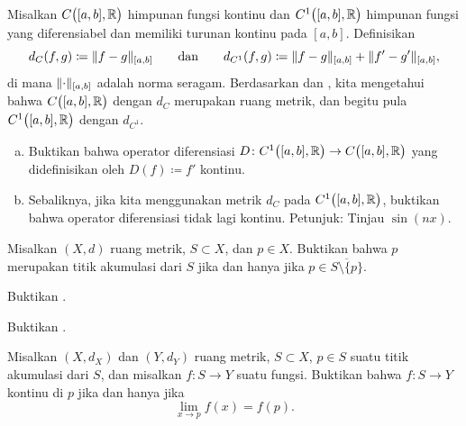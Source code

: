 \begin{samepage}
\begin{exercise}
Misalkan $C\bigl([a,b],{\mathbb{R}}\bigr)$ himpunan fungsi kontinu dan
$C^1\bigl([a,b],{\mathbb{R}}\bigr)$ himpunan fungsi yang
diferensiabel dan memiliki turunan kontinu pada $[a,b]$.
Definisikan
\begin{equation*}
d_{C}(f,g) \coloneqq \lVert {f-g} \rVert_{[a,b]}
\qquad \text{dan} \qquad
d_{C^1}(f,g) \coloneqq \lVert {f-g} \rVert_{[a,b]} + \lVert {f'-g'} \rVert_{[a,b]},
\end{equation*}
di mana $\lVert {\cdot} \rVert_{[a,b]}$ adalah norma seragam.
Berdasarkan  dan , kita mengetahui bahwa
$C\bigl([a,b],{\mathbb{R}}\bigr)$ dengan $d_C$ merupakan ruang metrik, dan
begitu pula
$C^1\bigl([a,b],{\mathbb{R}}\bigr)$ dengan $d_{C^1}$.
\begin{enumerate}[a)]
\item
Buktikan bahwa operator diferensiasi $D \colon 
C^1\bigl([a,b],{\mathbb{R}}\bigr) \to C\bigl([a,b],{\mathbb{R}}\bigr)$ yang didefinisikan oleh
$D(f) \coloneqq f'$ kontinu.
\item
Sebaliknya, jika kita menggunakan metrik $d_C$ pada $C^1\bigl([a,b],{\mathbb{R}}\bigr)$,
buktikan bahwa operator diferensiasi tidak lagi kontinu.  Petunjuk: Tinjau
$\sin(n x)$.
\end{enumerate}
\end{exercise}
\end{samepage}

\begin{exercise}
Misalkan $(X,d)$ ruang metrik, $S \subset X$, dan $p \in X$.  Buktikan bahwa
$p$ merupakan titik akumulasi dari $S$ jika dan hanya jika $p \in \overline{S \setminus \{
p \}}$.
\end{exercise}

\begin{exercise}
Buktikan .
\end{exercise}

\begin{exercise}
Buktikan .
\end{exercise}

\begin{exercise}
Misalkan $(X,d_X)$ dan $(Y,d_Y)$ ruang metrik, $S \subset X$, $p \in S$
suatu titik akumulasi dari $S$, dan misalkan $f \colon S \to Y$ suatu fungsi.
Buktikan bahwa
$f \colon S \to Y$ kontinu di $p$ jika dan hanya jika
\begin{equation*}
\lim_{x \to p} f(x) = f(p) .
\end{equation*}
\end{exercise}

